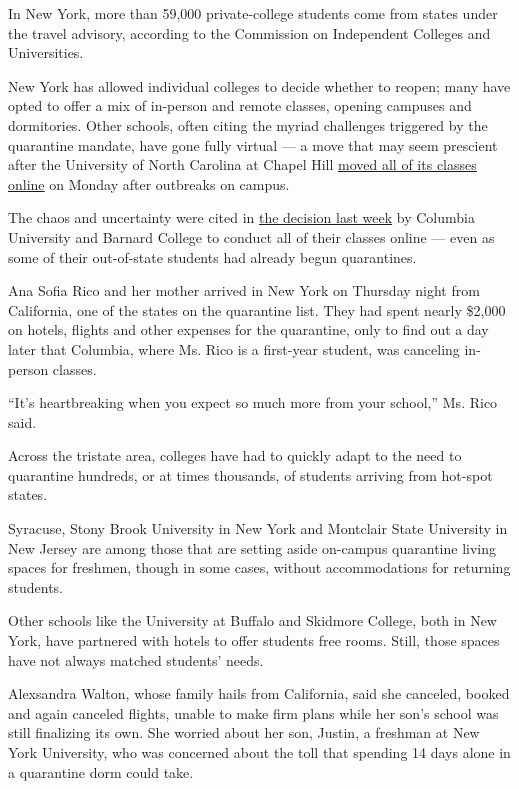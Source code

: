 In New York, more than 59,000 private-college students come from states
under the travel advisory, according to the Commission on Independent
Colleges and Universities.

New York has allowed individual colleges to decide whether to reopen;
many have opted to offer a mix of in-person and remote classes, opening
campuses and dormitories. Other schools, often citing the myriad
challenges triggered by the quarantine mandate, have gone fully virtual
--- a move that may seem prescient after the University of North
Carolina at Chapel Hill
\href{https://www.nytimes3xbfgragh.onion/2020/08/17/us/unc-chapel-hill-covid.html}{moved
all of its classes online} on Monday after outbreaks on campus.

The chaos and uncertainty were cited in
\href{https://president.columbia.edu/news/update-fall-term}{the decision
last week} by Columbia University and Barnard College to conduct all of
their classes online --- even as some of their out-of-state students had
already begun quarantines.

Ana Sofia Rico and her mother arrived in New York on Thursday night from
California, one of the states on the quarantine list. They had spent
nearly \$2,000 on hotels, flights and other expenses for the quarantine,
only to find out a day later that Columbia, where Ms. Rico is a
first-year student, was canceling in-person classes.

``It's heartbreaking when you expect so much more from your school,''
Ms. Rico said.

Across the tristate area, colleges have had to quickly adapt to the need
to quarantine hundreds, or at times thousands, of students arriving from
hot-spot states.

Syracuse, Stony Brook University in New York and Montclair State
University in New Jersey are among those that are setting aside
on-campus quarantine living spaces for freshmen, though in some cases,
without accommodations for returning students.

Other schools like the University at Buffalo and Skidmore College, both
in New York, have partnered with hotels to offer students free rooms.
Still, those spaces have not always matched students' needs.

Alexsandra Walton, whose family hails from California, said she
canceled, booked and again canceled flights, unable to make firm plans
while her son's school was still finalizing its own. She worried about
her son, Justin, a freshman at New York University, who was concerned
about the toll that spending 14 days alone in a quarantine dorm could
take.

